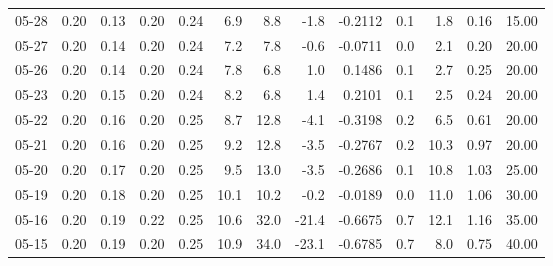 \begin{threeparttable}
{\begin{tabular}{lrrrrrrrrrrrr}
  05-28 &          0.20 &          0.13 &          0.20 &        0.24 &                 6.9 &                 8.8 &       -1.8 &      -0.2112 &                 0.1 &              1.8 &            0.16 &                  15.00 \\
  05-27 &          0.20 &          0.14 &          0.20 &        0.24 &                 7.2 &                 7.8 &       -0.6 &      -0.0711 &                 0.0 &              2.1 &            0.20 &                  20.00 \\
  05-26 &          0.20 &          0.14 &          0.20 &        0.24 &                 7.8 &                 6.8 &        1.0 &       0.1486 &                 0.1 &              2.7 &            0.25 &                  20.00 \\
  05-23 &          0.20 &          0.15 &          0.20 &        0.24 &                 8.2 &                 6.8 &        1.4 &       0.2101 &                 0.1 &              2.5 &            0.24 &                  20.00 \\
  05-22 &          0.20 &          0.16 &          0.20 &        0.25 &                 8.7 &                12.8 &       -4.1 &      -0.3198 &                 0.2 &              6.5 &            0.61 &                  20.00 \\
  05-21 &          0.20 &          0.16 &          0.20 &        0.25 &                 9.2 &                12.8 &       -3.5 &      -0.2767 &                 0.2 &             10.3 &            0.97 &                  20.00 \\
  05-20 &          0.20 &          0.17 &          0.20 &        0.25 &                 9.5 &                13.0 &       -3.5 &      -0.2686 &                 0.1 &             10.8 &            1.03 &                  25.00 \\
  05-19 &          0.20 &          0.18 &          0.20 &        0.25 &                10.1 &                10.2 &       -0.2 &      -0.0189 &                 0.0 &             11.0 &            1.06 &                  30.00 \\
  05-16 &          0.20 &          0.19 &          0.22 &        0.25 &                10.6 &                32.0 &      -21.4 &      -0.6675 &                 0.7 &             12.1 &            1.16 &                  35.00 \\
  05-15 &          0.20 &          0.19 &          0.20 &        0.25 &                10.9 &                34.0 &      -23.1 &      -0.6785 &                 0.7 &              8.0 &            0.75 &                  40.00 \\

\end{tabular}}
\end{threeparttable}
